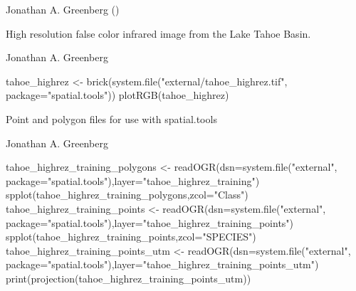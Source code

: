 \documentclass[a4paper]{book}
\begin{document}
%
\begin{Author}\relax
Jonathan A. Greenberg
()
\end{Author}
%
\begin{Description}\relax
High resolution false color infrared image from the Lake
Tahoe Basin.
\end{Description}
%
\begin{Author}\relax
Jonathan A. Greenberg 
\end{Author}
%
\begin{Examples}
\begin{ExampleCode}
tahoe_highrez <- brick(system.file("external/tahoe_highrez.tif", package="spatial.tools"))
plotRGB(tahoe_highrez)
\end{ExampleCode}
\end{Examples}
%
\begin{Description}\relax
Point and polygon files for use with spatial.tools
\end{Description}
%
\begin{Author}\relax
Jonathan A. Greenberg 
\end{Author}
%
\begin{Examples}
\begin{ExampleCode}
tahoe_highrez_training_polygons <- readOGR(dsn=system.file("external", package="spatial.tools"),layer="tahoe_highrez_training")
spplot(tahoe_highrez_training_polygons,zcol="Class")
tahoe_highrez_training_points <- readOGR(dsn=system.file("external", package="spatial.tools"),layer="tahoe_highrez_training_points")
spplot(tahoe_highrez_training_points,zcol="SPECIES")
tahoe_highrez_training_points_utm <- readOGR(dsn=system.file("external", package="spatial.tools"),layer="tahoe_highrez_training_points_utm")
print(projection(tahoe_highrez_training_points_utm))
\end{ExampleCode}
\end{Examples}
\end{document}
